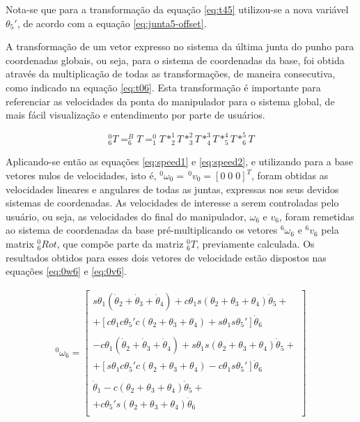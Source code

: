 Nota-se que para a transformação da equação \ref{eq:t45} utilizou-se a nova variável
$\theta_5'$, de acordo com a equação \ref{eq:junta5-offset}.

A transformação de um vetor expresso no sistema da última junta do punho para coordenadas
globais, ou seja, para o sistema de coordenadas da base, foi obtida através 
da multiplicação de todas as transformações, de maneira consecutiva, como indicado na
equação \ref{eq:t06}.
Esta transformação é importante para referenciar as velocidades
da ponta do manipulador para o sistema global, de mais fácil visualização e entendimento
por parte de usuários.

\begin{equation}
    \label{eq:t06}
    ^0_6T = ^B_6T = ^0_1T*^1_2T*^2_3T*^3_4T*^4_5T*^5_6T
\end{equation}

Aplicando-se então as equações \ref{eq:speed1} e \ref{eq:speed2}, e utilizando para a 
base vetores nulos de velocidades, isto é, $^0\omega_0 = \, ^0v_0 = \left[0 \; 0 \; 0 \right]^T$,
foram obtidas as velocidades lineares e angulares de todas as juntas, expressas nos seus devidos 
sistemas de coordenadas. As velocidades de interesse a serem controladas pelo usuário, ou seja,
as velocidades do final do manipulador, $\omega_6$ e $v_6$, foram remetidas ao sistema de 
coordenadas da base pré-multiplicando os vetores $^6\omega_6$ e $^6v_6$ pela matrix $^0_6Rot$,
que compõe parte da matriz $^0_6T$, previamente calculada.
Os resultados obtidos para esses dois vetores de velocidade estão dispostos nas equações 
\ref{eq:0w6} e \ref{eq:0v6}.

\begin{equation}
    \label{eq:0w6}
\begin{gathered}
    ^0\omega_6 = \begin{bmatrix}
        s\theta_1(\dot{\theta}_2 + \dot{\theta}_3 + \dot{\theta}_4) + c\theta_1s(\theta_2+\theta_3+\theta_4)\dot{\theta}_5 + \\
        + [c\theta_1c\theta_5'c(\theta_2+\theta_3+\theta_4) +s\theta_1s\theta_5']\dot{\theta}_6\\
        \\
        -c\theta_1(\dot{\theta}_2+\dot{\theta}_3+\dot{\theta}_4) + s\theta_1s(\theta_2+\theta_3+\theta_4)\dot{\theta}_5 + \\
        +[s\theta_1c\theta_5'c(\theta_2+\theta_3+\theta_4) -c\theta_1s\theta_5']\dot{\theta}_6 \\
        \\
        \dot{\theta}_1 -c(\theta_2+\theta_3+\theta_4)\dot{\theta}_5 + \\
        +c\theta_5's(\theta_2+\theta_3+\theta_4)\dot{\theta}_6 \\   
    \end{bmatrix}
\end{gathered}
\end{equation}

